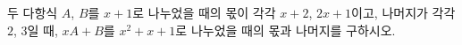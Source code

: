 두 다항식 $A$, $B$를 $x+1$로 나누었을 때의 몫이 각각 $x+2$, $2x+1$이고, 나머지가 각각 $2$, $3$일 때, $xA+B$를 $x^2+x+1$로 나누었을 때의 몫과 나머지를 구하시오.
